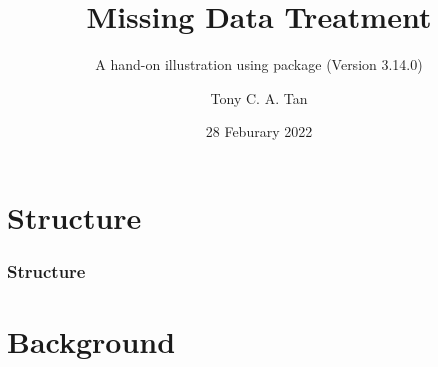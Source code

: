\documentclass[UKenglish
  pdftex                    %
  dvipsnames                %
]{beamer}
\author{Tony C. A. Tan}
\title{Missing Data Treatment}
\subtitle{A hand-on illustration using \cR package \pk{mice} (Version 3.14.0)}
\date{28 Feburary 2022}
\begin{document}
\section*{Structure}
\begin{frame}%
\frametitle{Structure}

  \tableofcontents%

\end{frame}

\section{Background}
\end{document}
